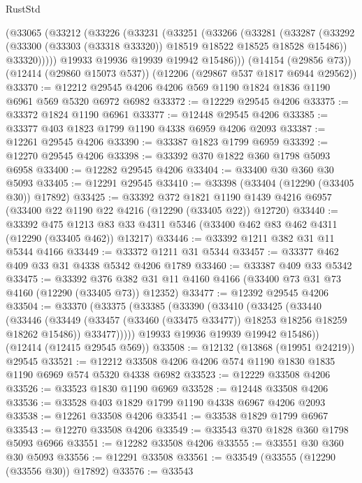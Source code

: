 \begin{lexlean}{RustStd}
\begin{coremodule}
{\begin{coremodule}
{{{{{{{{{{{{{{{{{{{{{{{{{{{{{{{{{{{{{{{{{{{{{{{{{{    (@33065
      (@33212
        (@33226
          (@33231
            (@33251
              (@33266
                (@33281
                  (@33287
                    (@33292 (@33300 (@33303 (@33318 @33320)) @18519 @18522 @18525 @18528 @15486))
                    @33320)))))
          @19933
          @19936
          @19939
          @19942
          @15486)))
    (@14154 (@29856 @73))
    (@12414 (@29860 @15073 @537))
    (@12206 (@29867 @537 @1817 @6944 @29562))
@33370 := @12212 @29545 @4206 @4206 @569 @1190 @1824 @1836 @1190 @6961 @569 @5320 @6972 @6982
@33372 := @12229 @29545 @4206
@33375 := @33372 @1824 @1190 @6961
@33377 := @12448 @29545 @4206
@33385 := @33377 @403 @1823 @1799 @1190 @4338 @6959 @4206 @2093
@33387 := @12261 @29545 @4206
@33390 := @33387 @1823 @1799 @6959
@33392 := @12270 @29545 @4206
@33398 := @33392 @370 @1822 @360 @1798 @5093 @6958
@33400 := @12282 @29545 @4206
@33404 := @33400 @30 @360 @30 @5093
@33405 := @12291 @29545
@33410 := @33398 (@33404 (@12290 (@33405 @30)) @17892)
@33425 := @33392
    @372
    @1821
    @1190
    @1439
    @4216
    @6957
    (@33400 @22 @1190 @22 @4216 (@12290 (@33405 @22)) @12720)
@33440 := @33392
    @475
    @1213
    @83
    @33
    @4311
    @5346
    (@33400 @462 @83 @462 @4311 (@12290 (@33405 @462)) @13217)
@33446 := @33392 @1211 @382 @31 @11 @5344 @4166
@33449 := @33372 @1211 @31 @5344
@33457 := @33377 @462 @409 @33 @31 @4338 @5342 @4206 @1789
@33460 := @33387 @409 @33 @5342
@33475 := @33392
    @376
    @382
    @31
    @11
    @4160
    @4166
    (@33400 @73 @31 @73 @4160 (@12290 (@33405 @73)) @12352)
@33477 := @12392 @29545 @4206
@33504 := @33370
    (@33375
      (@33385
        (@33390
          (@33410
            (@33425
              (@33440
                (@33446
                  (@33449 (@33457 (@33460 (@33475 @33477)) @18253 @18256 @18259 @18262 @15486))
                  @33477)))))
        @19933
        @19936
        @19939
        @19942
        @15486))
    (@12414 (@12415 @29545 @569))
@33508 := @12132 (@13868 (@19951 @24219)) @29545
@33521 := @12212 @33508 @4206 @4206 @574 @1190 @1830 @1835 @1190 @6969 @574 @5320 @4338 @6982
@33523 := @12229 @33508 @4206
@33526 := @33523 @1830 @1190 @6969
@33528 := @12448 @33508 @4206
@33536 := @33528 @403 @1829 @1799 @1190 @4338 @6967 @4206 @2093
@33538 := @12261 @33508 @4206
@33541 := @33538 @1829 @1799 @6967
@33543 := @12270 @33508 @4206
@33549 := @33543 @370 @1828 @360 @1798 @5093 @6966
@33551 := @12282 @33508 @4206
@33555 := @33551 @30 @360 @30 @5093
@33556 := @12291 @33508
@33561 := @33549 (@33555 (@12290 (@33556 @30)) @17892)
@33576 := @33543
}}}}}}}}}}}}}}}}}}}}}}}}}}}}}}}}}}}}}}}}}}}}}}}}}}
\end{coremodule}}
\end{coremodule}
\end{lexlean}
